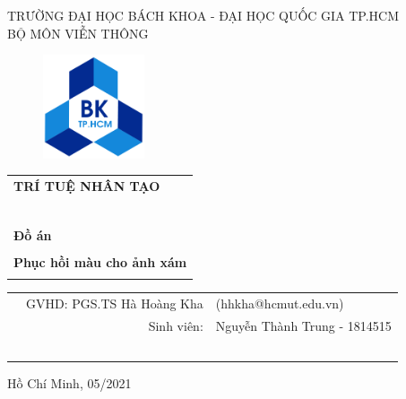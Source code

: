\documentclass[a4paper]{article}
\begin{document}
\begin{titlepage}

\begin{center}
TRƯỜNG ĐẠI HỌC BÁCH KHOA - ĐẠI HỌC QUỐC GIA TP.HCM\\
BỘ MÔN VIỄN THÔNG
\end{center}

\vspace{1cm}

\begin{figure}[h!]
\begin{center}
\includegraphics[width=3cm]{hcmut.png}
\end{center}
\end{figure}

\vspace{1cm}


\begin{center}
\begin{tabular}{c}
\multicolumn{1}{l}{\textbf{{\Large TRÍ TUỆ NHÂN TẠO}}}\\
~~\\
\hline
\\
\multicolumn{1}{l}{\textbf{{\Large Đồ án}}}\\
\\
\textbf{\Huge Phục hồi màu cho ảnh xám}\\
\\
\hline
\end{tabular}
\end{center}

\vspace{3cm}

\begin{table}[h]
\begin{tabular}{rrl}

\hspace{2.7 cm} & GVHD: PGS.TS Hà Hoàng Kha & (hhkha@hcmut.edu.vn)\\
& Sinh viên: & Nguyễn Thành Trung - 1814515\\
\\\\\\\\\\

\end{tabular}
\end{table}

\begin{center}
{\footnotesize Hồ Chí Minh, 05/2021}
\end{center}
\end{titlepage}
\end{document}
